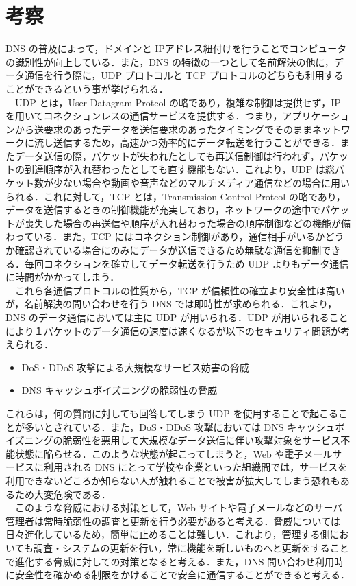 \documentclass[a4j,titlepage]{jarticle}
\begin{document}
\section{考察}
DNS の普及によって，ドメインと IPアドレス紐付けを行うことでコンピュータの識別性が向上している．また，DNS の特徴の一つとして名前解決の他に，データ通信を行う際に，UDP プロトコルと TCP プロトコルのどちらも利用することができるという事が挙げられる．\\
　UDP とは，User Datagram Protcol の略であり，複雑な制御は提供せず，IP を用いてコネクションレスの通信サービスを提供する．つまり，アプリケーションから送要求のあったデータを送信要求のあったタイミングでそのままネットワークに流し送信するため，高速かつ効率的にデータ転送を行うことができる．またデータ送信の際，パケットが失われたとしても再送信制御は行われず，パケットの到達順序が入れ替わったとしても直す機能もない．これより，UDP は総パケット数が少ない場合や動画や音声などのマルチメディア通信などの場合に用いられる．これに対して，TCP とは，Transmission Control Protcol の略であり，データを送信するときの制御機能が充実しており，ネットワークの途中でパケットが喪失した場合の再送信や順序が入れ替わった場合の順序制御などの機能が備わっている．また，TCP にはコネクション制御があり，通信相手がいるかどうか確認されている場合にのみにデータが送信できるため無駄な通信を抑制できる．毎回コネクションを確立してデータ転送を行うため UDP よりもデータ通信に時間がかかってしまう\cite{bib:iptext}．\\
　これら各通信プロトコルの性質から，TCP が信頼性の確立より安全性は高いが，名前解決の問い合わせを行う DNS では即時性が求められる．これより，DNS のデータ通信においては主に UDP が用いられる．UDP が用いられることにより１パケットのデータ通信の速度は速くなるが以下のセキュリティ問題が考えられる．

\begin{itemize}
\item DoS・DDoS 攻撃による大規模なサービス妨害の脅威

\item DNS キャッシュポイズニングの脆弱性の脅威

\end{itemize}

これらは，何の質問に対しても回答してしまう UDP を使用することで起こることが多いとされている．また，DoS・DDoS 攻撃においては DNS キャッシュポイズニングの脆弱性を悪用して大規模なデータ送信に伴い攻撃対象をサービス不能状態に陥らせる．このような状態が起こってしまうと，Web や電子メールサービスに利用される DNS にとって学校や企業といった組織間では，サービスを利用できないどころか知らない人が触れることで被害が拡大してしまう恐れもあるため大変危険である．\\
　このような脅威における対策として，Web サイトや電子メールなどのサーバ管理者は常時脆弱性の調査と更新を行う必要があると考える．脅威については日々進化しているため，簡単に止めることは難しい．これより，管理する側においても調査・システムの更新を行い，常に機能を新しいものへと更新をすることで進化する脅威に対しての対策となると考える．また，DNS 問い合わせ利用時に安全性を確かめる制限をかけることで安全に通信することができると考える．
\end{document}
